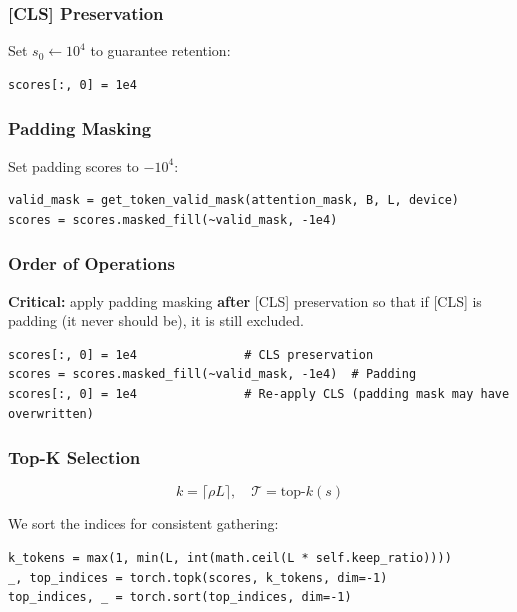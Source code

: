 \subsubsection{[CLS] Preservation}

Set $s_0 \leftarrow 10^4$ to guarantee retention:

\begin{lstlisting}
scores[:, 0] = 1e4
\end{lstlisting}

\subsubsection{Padding Masking}

Set padding scores to $-10^4$:

\begin{lstlisting}
valid_mask = get_token_valid_mask(attention_mask, B, L, device)
scores = scores.masked_fill(~valid_mask, -1e4)
\end{lstlisting}

\subsubsection{Order of Operations}

\textbf{Critical:} apply padding masking \textbf{after} [CLS] preservation so that 
if [CLS] is padding (it never should be), it is still excluded.

\begin{lstlisting}
scores[:, 0] = 1e4               # CLS preservation
scores = scores.masked_fill(~valid_mask, -1e4)  # Padding
scores[:, 0] = 1e4               # Re-apply CLS (padding mask may have overwritten)
\end{lstlisting}

\subsubsection{Top-K Selection}

\[
k = \lceil \rho L \rceil, \quad
\mathcal{T} = \text{top-}k(s)
\tag{4.2}
\]

We sort the indices for consistent gathering:

\begin{lstlisting}
k_tokens = max(1, min(L, int(math.ceil(L * self.keep_ratio))))
_, top_indices = torch.topk(scores, k_tokens, dim=-1)
top_indices, _ = torch.sort(top_indices, dim=-1)
\end{lstlisting}

